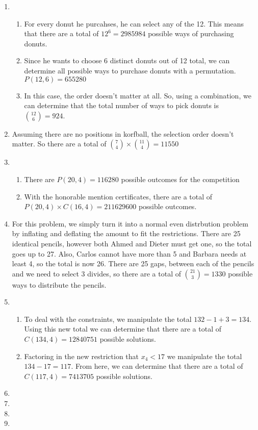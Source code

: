 \documentclass[12pt]{article}
\newcommand{\s}[1]{\setcounter{enumi}{#1}}
\begin{document}
\begin{enumerate}
  \item 
    \begin{enumerate}
      \item For every donut he purcahses, he can select any of the 12. This means that there are a total of $12^6 = 2985984$ possible ways of purchasing donuts.
      \item Since he wants to choose 6 distinct donuts out of 12 total, we can determine all possible ways to purchase donuts with a permutation. $P(12, 6) = 655280$
      \item In this case, the order doesn't matter at all. So, using a combination, we can determine that the total number of ways to pick donuts is $\binom{12}{6} = 924$.
    \end{enumerate}
  \item Assuming there are no positions in korfball, the selection order doesn't matter. So there are a total of $\binom{7}{4} \times \binom{11}{4} = 11550$
  \item
    \begin{enumerate}
      \item There are $P(20,4) = 116280$ possible outcomes for the competition
      \item With the honorable mention certificates, there are a total of $P(20,4) \times C(16,4) = 211629600$ possible outcomes.
    \end{enumerate}

  \s{14}
  
  \item For this problem, we simply turn it into a normal even distrbution problem by inflating and deflating the amount to fit the restrictions. There are 25 identical pencils, however both Ahmed and Dieter must get one, so the total goes up to 27. Also, Carlos cannot have more than 5 and Barbara needs at least 4, so the total is now 26. There are 25 gaps, between each of the pencils and we need to select 3 divides, so there are a total of $\binom{21}{3} = 1330$ possible ways to distribute the pencils.

  \s{16}

  \item 
    \begin{enumerate}
      \item To deal with the constraints, we manipulate the total $132 - 1 + 3 = 134$. Using this new total we can determine that there are a total of $C(134, 4) = 12840751$ possible solutions.
      \item Factoring in the new restriction that $x_4 < 17$ we manipulate the total $134 - 17 = 117$. From here, we can determine that there are a total of $C(117, 4) = 7413705$ possible solutions.
    \end{enumerate}

  \s{19}

  \item

  \s{23}

  \item

  \s{25}

  \item

  \s{27}

  \item

\end{enumerate}
\end{document}
